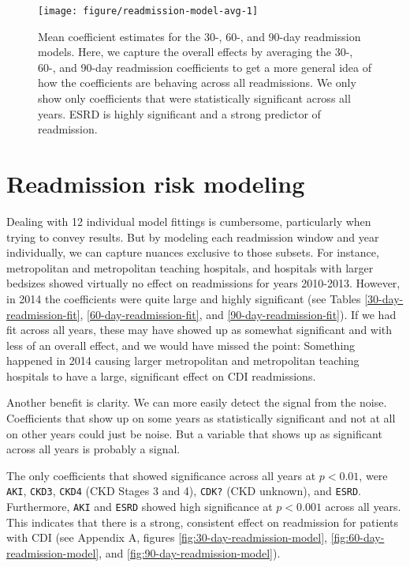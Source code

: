 \documentclass[12pt]{ociamthesis}\usepackage[]{graphicx}\usepackage[]{color}
\newenvironment{knitrout}{}{} %
\begin{document}
\begin{knitrout}
\color{fgcolor}\begin{figure}

{\centering \texttt{[image: figure/readmission-model-avg-1]} 

}

\caption[Mean coefficient estimates for the 30-, 60-, and 90-day readmission models]{Mean coefficient estimates for the 30-, 60-, and 90-day readmission models. Here, we capture the overall effects by averaging the 30-, 60-, and 90-day readmission coefficients to get a more general idea of how the coefficients are behaving across all readmissions. We only show only coefficients that were statistically significant across all years. ESRD is highly significant and a strong predictor of readmission.}\label{fig:readmission-model-avg}
\end{figure}


\end{knitrout}
\label{fig:readmission-model-avg}


\section{Readmission risk modeling}

Dealing with 12 individual model fittings is cumbersome, particularly when trying to convey results.
But by modeling each readmission window and year individually, we can capture nuances exclusive to those subsets.
For instance, metropolitan and metropolitan teaching hospitals, and hospitals with larger bedsizes showed virtually no effect on readmissions for years 2010-2013. 
However, in 2014 the coefficients were quite large and highly significant (see Tables \ref{30-day-readmission-fit}, \ref{60-day-readmission-fit}, and \ref{90-day-readmission-fit}).
If we had fit across all years, these may have showed up as somewhat significant and with less of an overall effect, and we would have missed the point:
Something happened in 2014 causing larger metropolitan and metropolitan teaching hospitals to have a large, significant effect on CDI readmissions. 

Another benefit is clarity. We can more easily detect the signal from the noise. Coefficients that show up on some years as statistically significant and not at all
on other years could just be noise. But a variable that shows up as significant across all years is probably a signal. 

The only coefficients that showed significance across all years at $p < 0.01$, were \texttt{AKI}, \texttt{CKD3}, \texttt{CKD4} (CKD Stages 3 and 4), 
\texttt{CDK?} (CKD unknown), and \texttt{ESRD}. Furthermore, \texttt{AKI} and \texttt{ESRD} showed high significance at $p < 0.001$ across all years.
This indicates that there is a strong, consistent effect on readmission for patients with CDI
(see Appendix A, figures \ref{fig:30-day-readmission-model}, \ref{fig:60-day-readmission-model}, and \ref{fig:90-day-readmission-model}).
\end{document}
